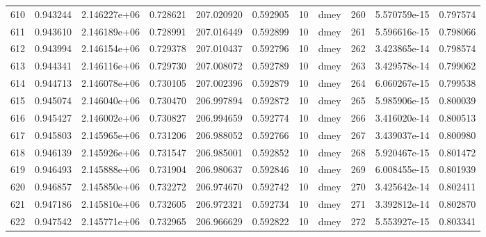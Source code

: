 \begin{tabular}{lrrrrrrlrrr}
610  &    0.943244 &        2.146227e+06 &  0.728621 &              207.020920 &    0.592905 &      10 &         dmey &    260 &   5.570759e-15 &      0.797574 \\
611  &    0.943610 &        2.146189e+06 &  0.728991 &              207.016449 &    0.592899 &      10 &         dmey &    261 &   5.596616e-15 &      0.798066 \\
612  &    0.943994 &        2.146154e+06 &  0.729378 &              207.010437 &    0.592796 &      10 &         dmey &    262 &   3.423865e-14 &      0.798574 \\
613  &    0.944341 &        2.146116e+06 &  0.729730 &              207.008072 &    0.592789 &      10 &         dmey &    263 &   3.429578e-14 &      0.799062 \\
614  &    0.944713 &        2.146078e+06 &  0.730105 &              207.002396 &    0.592879 &      10 &         dmey &    264 &   6.060267e-15 &      0.799538 \\
615  &    0.945074 &        2.146040e+06 &  0.730470 &              206.997894 &    0.592872 &      10 &         dmey &    265 &   5.985906e-15 &      0.800039 \\
616  &    0.945427 &        2.146002e+06 &  0.730827 &              206.994659 &    0.592774 &      10 &         dmey &    266 &   3.416020e-14 &      0.800513 \\
617  &    0.945803 &        2.145965e+06 &  0.731206 &              206.988052 &    0.592766 &      10 &         dmey &    267 &   3.439037e-14 &      0.800980 \\
618  &    0.946139 &        2.145926e+06 &  0.731547 &              206.985001 &    0.592852 &      10 &         dmey &    268 &   5.920467e-15 &      0.801472 \\
619  &    0.946493 &        2.145888e+06 &  0.731904 &              206.980637 &    0.592846 &      10 &         dmey &    269 &   6.008455e-15 &      0.801939 \\
620  &    0.946857 &        2.145850e+06 &  0.732272 &              206.974670 &    0.592742 &      10 &         dmey &    270 &   3.425642e-14 &      0.802411 \\
621  &    0.947186 &        2.145810e+06 &  0.732605 &              206.972321 &    0.592734 &      10 &         dmey &    271 &   3.392812e-14 &      0.802870 \\
622  &    0.947542 &        2.145771e+06 &  0.732965 &              206.966629 &    0.592822 &      10 &         dmey &    272 &   5.553927e-15 &      0.803341 \\

\end{tabular}
